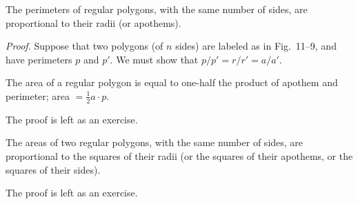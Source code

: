 \documentclass[11pt]{book}
\theoremstyle{XIplainnote}
\theoremstyle{bkplain}
\begin{document}
\FIGXIEIGHTNINE

\begin{theorem}
The perimeters of regular polygons, with the same number of sides, are
proportional to their radii (or apothems).
\end{theorem}

\noindent\emph{Proof.} Suppose that two polygons (of $n$ sides) are labeled as
in Fig.~11--9, and have perimeters $p$ and $p'$. We must show that
$p/p' = r/r' = a/a'$.

\begin{steps}
\end{steps}

\begin{theorem}
The area of a regular polygon is equal to one-half the product of apothem and
perimeter; area $= \frac{1}{2}a \cdot p$.
\end{theorem}

\noindent The proof is left as an exercise.

\begin{theorem}
The areas of two regular polygons, with the same number of sides, are
proportional to the squares of their radii (or the squares of their apothems,
or the squares of their sides).
\end{theorem}

\noindent The proof is left as an exercise.
\end{document}
